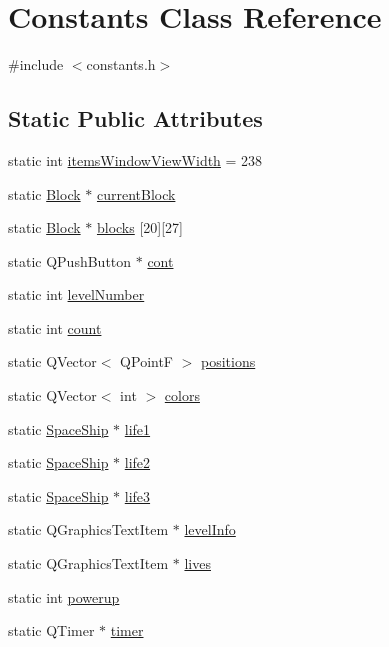 \hypertarget{class_constants}{
\section{Constants Class Reference}
\label{class_constants}
}


{\ttfamily \#include $<$constants.h$>$}\subsection*{Static Public Attributes}
\begin{DoxyCompactItemize}
\item 
static int \hyperlink{class_constants_ac2f79d1f42a45d4e8bbb648de429d93a}{itemsWindowViewWidth} = 238
\item 
static \hyperlink{class_block}{Block} $\ast$ \hyperlink{class_constants_a156644d2eac78b49b57528021e6841e8}{currentBlock}
\item 
static \hyperlink{class_block}{Block} $\ast$ \hyperlink{class_constants_a0e4afb47e79ae40e095d3ab4ef111727}{blocks} \mbox{[}20\mbox{]}\mbox{[}27\mbox{]}
\item 
static QPushButton $\ast$ \hyperlink{class_constants_a8f49de0072adb2398a2f7c76eac4716b}{cont}
\item 
static int \hyperlink{class_constants_ad29cd8b25520469b86004002c69f57a6}{levelNumber}
\item 
static int \hyperlink{class_constants_a1b683196215efa1070fa1a339ebfb1e7}{count}
\item 
static QVector$<$ QPointF $>$ \hyperlink{class_constants_a5dba875f5a45bc1db6ba815568d0992c}{positions}
\item 
static QVector$<$ int $>$ \hyperlink{class_constants_ab41b19d22c19c87736fe7fce43e4b54a}{colors}
\item 
static \hyperlink{class_space_ship}{SpaceShip} $\ast$ \hyperlink{class_constants_ab40abe96c335a7d98beb80da51e32e6a}{life1}
\item 
static \hyperlink{class_space_ship}{SpaceShip} $\ast$ \hyperlink{class_constants_a70a4c2e4725758d9ee34a4424503e6f5}{life2}
\item 
static \hyperlink{class_space_ship}{SpaceShip} $\ast$ \hyperlink{class_constants_a7b43b0f6bf4e053d0d7ec448cebade42}{life3}
\item 
static QGraphicsTextItem $\ast$ \hyperlink{class_constants_a1690abb2f0185ca0c74b3cad7db6176e}{levelInfo}
\item 
static QGraphicsTextItem $\ast$ \hyperlink{class_constants_a27939bf9b68dbbc91f1337e1efebca31}{lives}
\item 
static int \hyperlink{class_constants_a0ea79f17bacabd0d21cf906c0b9c4f74}{powerup}
\item 
static QTimer $\ast$ \hyperlink{class_constants_a6923db6bb28609e4ba0a52977b8b9d12}{timer}
\end{DoxyCompactItemize}


